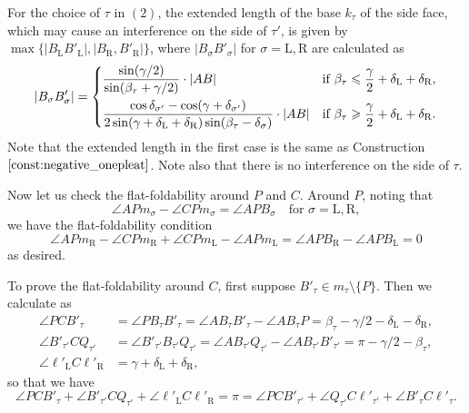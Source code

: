 \documentclass[11pt]{amsart}
\numberwithin{equation}{section}
\numberwithin{theorem}{section}
\newcommand{\Lt}{\ensuremath{\mathrm{L}}}
\newcommand{\Rt}{\ensuremath{\mathrm{R}}}
\newcommand{\norm}[1]{\ensuremath{\left| #1 \right|}}
\begin{document}
For the choice of $\tau$ in $(2)$, the extended length of the base $k_\tau$ of the side face, which may cause an interference on the side of $\tau'$, is given by
$\max\{\norm{B_\Lt B'_\Lt},\norm{B_\Rt ,B'_\Rt}\}$, where $\norm{B_\sigma B'_\sigma}$ for $\sigma =\Lt ,\Rt$ are calculated as
\begin{equation*}
\norm{B_\sigma B'_\sigma}=
\begin{dcases}
\frac{\sin (\gamma /2)}{\sin (\beta_\tau +\gamma /2)}\cdot\norm{AB}
&\text{if }\beta_\tau\leqslant\frac{\gamma}{2}+\delta_\Lt +\delta_\Rt ,\\
\frac{\cos\delta_{\sigma'}-\cos (\gamma +\delta_{\sigma'})}{2\sin (\gamma +\delta_\Lt +\delta_\Rt )\sin (\beta_\tau -\delta_\sigma )}\cdot\norm{AB}
&\text{if }\beta_\tau\geqslant\frac{\gamma}{2}+\delta_\Lt +\delta_\Rt .
\end{dcases}
\end{equation*}
Note that the extended length in the first case is the same as Construction $\ref{const:negative_onepleat}$.
Note also that there is no interference on the side of $\tau$.

Now let us check the flat-foldability around $P$ and $C$.
Around $P$, noting that
\begin{equation*}
\angle APm_\sigma -\angle CPm_\sigma=\angle APB_\sigma\quad\text{for }\sigma =\Lt ,\Rt ,
\end{equation*}
we have the flat-foldability condition
\begin{equation*}
\angle APm_\Rt -\angle CPm_\Rt +\angle CPm_\Lt -\angle APm_\Lt =\angle APB_\Rt -\angle APB_\Lt =0
\end{equation*}
as desired.

To prove the flat-foldability around $C$, first suppose $B'_\tau\in m_\tau\setminus\{P \}$.
Then we calculate as 
\begin{align*}
\angle PCB'_\tau &=\angle PB_\tau B'_\tau =\angle AB_\tau B'_\tau -\angle AB_\tau P=\beta_\tau -\gamma /2-\delta_\Lt -\delta_\Rt ,\\
\angle B'_{\tau'}CQ_{\tau'}&=\angle B'_{\tau'}B_{\tau'}Q_{\tau'}=\angle AB_{\tau'}Q_{\tau'}-\angle AB_{\tau'}B'_{\tau'}
=\pi -\gamma /2-\beta_\tau ,\\
\angle \ell'_\Lt C\ell'_\Rt&=\gamma +\delta_\Lt +\delta_\Rt ,
\end{align*}
so that we have
\begin{equation}\label{eq:flat-foldability_C_1}
\angle PCB'_\tau +\angle B'_{\tau'}CQ_{\tau'}+\angle \ell'_\Lt C\ell'_\Rt =\pi =\angle PCB'_{\tau'}+\angle Q_{\tau'}C\ell'_{\tau'}+\angle B'_\tau C\ell'_\tau .
\end{equation}
\end{document}
